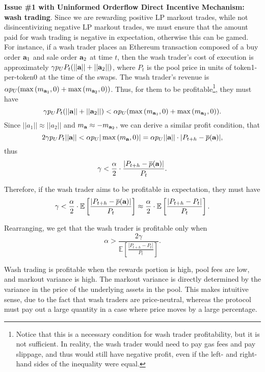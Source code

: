     \textbf{Issue \#1 with Uninformed Orderflow Direct Incentive Mechanism: wash trading}.
    Since we are rewarding positive LP markout trades, while not disincentivizing negative LP markout trades, we must ensure that the amount paid for wash trading is negative in expectation, otherwise this can be gamed. For instance, if a wash trader places an Ethereum transaction composed of a buy order $\textbf a_1$ and sale order $\textbf a_2$ at time $t$, then the wash trader's cost of execution is approximately $\gamma p_U P_t(||\textbf a|| + ||\textbf a_2||)$, where $P_t$ is the pool price in units of token1-per-token0 at the time of the swaps. The wash trader's revenue is $\alpha p_U ( \max{(m_{\textbf a_1}, 0)} + \max{(m_{\textbf a_2}, 0)} )$. Thus, for them to be profitable\footnote{Notice that this is a necessary condition for wash trader profitability, but it is not sufficient. In reality, the wash trader would need to pay gas fees and pay slippage, and thus would still have negative profit, even if the left- and right-hand sides of the inequality were equal.}, they must have $$\gamma p_U P_t(||\textbf a|| + ||\textbf a_2||) < \alpha p_U ( \max{(m_{\textbf a_1}, 0)} + \max{(m_{\textbf a_2}, 0)} ).$$
    Since $||a_1|| \approx ||a_2||$ and $m_{\textbf a} \approx - m_{\textbf a_2}$, we can derive a similar profit condition, that $$2\gamma p_U P_t||\textbf a|| < \alpha p_U |\max{(m_{\textbf a}, 0)}| = \alpha p_U ||\textbf a|| \cdot |P_{t+h} - \overline p(\textbf a)|,$$ thus
    $$\gamma < \frac{\alpha}{2} \cdot \frac{|P_{t+h} - \overline p(\textbf a)|}{P_t}.$$

    Therefore, if the wash trader aims to be profitable in expectation, they must have
        $$\gamma < \frac{\alpha}{2} \cdot \mathbb E \left[ \frac{|P_{t+h} - \overline p(\textbf a)|}{P_t} \right] \approx \frac{\alpha}{2} \cdot \mathbb E \left[ \frac{|P_{t+h} - P_t|}{P_t} \right].$$

    Rearranging, we get that the wash trader is profitable only when 
        $$\alpha > \frac{2\gamma }{\mathbb E \left[ \frac{|P_{t+h} - P_t|}{P_t} \right]}.$$

    Wash trading is profitable when the rewards portion is high, pool fees are low, and markout variance is high. The markout variance is directly determined by the variance in the price of the underlying assets in the pool. This makes intuitive sense, due to the fact that wash traders are price-neutral, whereas the protocol must pay out a large quantity in a case where price moves by a large percentage.
    
